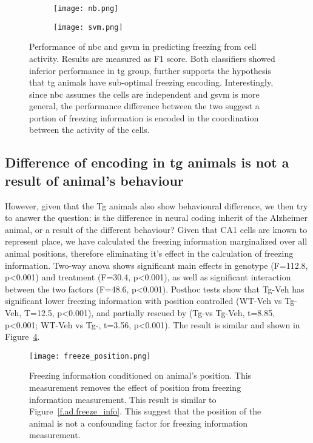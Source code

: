 \begin{figure}[h]
    \begin{subfigure}[h]{\textwidth}
        \texttt{[image: nb.png]}
        \caption{\label{f.ad.nb}}
    \end{subfigure}
    \begin{subfigure}[h]{\textwidth}
        \texttt{[image: svm.png]}
        \caption{\label{f.ad.svm}}
    \end{subfigure}
    \caption{Performance of  \gls{nbc} and  \gls{gsvm} in predicting freezing from cell activity. Results are measured as F1 score. Both classifiers showed inferior performance in \gls{tg} group, further supports the hypothesis that \gls{tg} animals have sub-optimal freezing encoding. Interestingly, since \gls{nbc} assumes the cells are independent and \gls{gsvm} is more general, the performance difference between the two suggest a portion of freezing information is encoded in the coordination between the activity of the cells. \label{f.ad.classifier}}
\end{figure}




\subsection{Difference of encoding in \gls{tg} animals is not a result of animal's behaviour}

However, given that the Tg animals also show behavioural difference, we then try to answer the question: is the difference in neural coding inherit of the Alzheimer animal, or a result of the different behaviour? Given that CA1 cells are known to represent place, we have calculated the freezing information marginalized over all animal positions, therefore eliminating it's effect in the calculation of freezing information. Two-way \gls{anova} shows significant main effects in genotype (F=112.8, p<0.001) and treatment (F=30.4, p<0.001), as well as significant interaction between the two factors (F=48.6, p<0.001). Posthoc tests show that Tg-Veh has significant lower freezing information with position controlled (WT-Veh vs Tg-Veh, T=12.5, p<0.001), and partially rescued by \tglu (Tg-\tglu vs Tg-Veh, t=8.85, p<0.001; WT-Veh vs Tg-\tglu, t=3.56, p<0.001). The result is similar and shown in Figure~\ref{f.ad.freeze_ctrl}.  
\begin{figure}[h]
    \texttt{[image: freeze\_position.png]}
    \caption{Freezing information conditioned on animal's position. This measurement removes the effect of position from freezing information measurement. This result is similar to Figure~\ref{f.ad.freeze_info}. This suggest that the position of the animal is not a confounding factor for freezing information measurement. \label{f.ad.freeze_ctrl}}
\end{figure}


